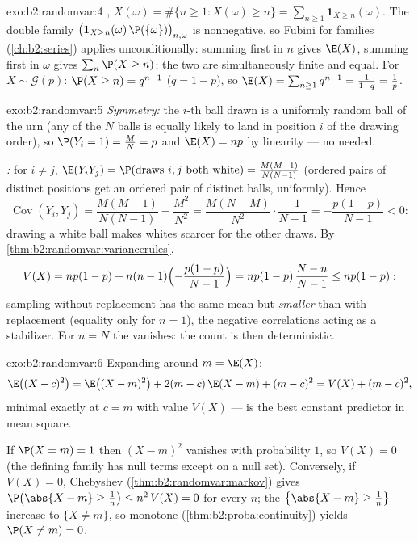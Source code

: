 \begin{solution}{exo:b2:randomvar:4}
, $X(\omega) = \#\{n \geq 1 : X(\omega) \geq n\} =
\sum_{n\geq1}\mathbf{1}_{X \geq n}(\omega)$. The double family
$\bigl(\mathbf{1}_{X \geq n}(\omega)\,\P(\{\omega\})\bigr)_{n,
\omega}$ is nonnegative, so Fubini for families
(\cref{ch:b2:series}) applies unconditionally: summing first in
$n$ gives $\E(X)$, summing first in $\omega$ gives $\sum_n \P(X
\geq n)$; the two are simultaneously finite and equal. For $X \sim
\mathcal{G}(p)$: $\P(X \geq n) = q^{n-1}$ ($q = 1-p$), so $\E(X) =
\sum_{n\geq1}q^{n-1} = \frac{1}{1 - q} = \frac1p$.
\end{solution}

\begin{solution}{exo:b2:randomvar:5}
\emph{Symmetry:} the $i$-th ball drawn is a uniformly random ball
of the urn (any of the $N$ balls is equally likely to land in
position $i$ of the drawing order), so $\P(Y_i = 1) = \frac MN =
p$ and $\E(X) = np$ by linearity --- no  needed.

\emph{:} for $i \neq j$, $\E(Y_iY_j) = \P(\text{draws }
i, j \text{ both white}) = \frac{M(M-1)}{N(N-1)}$ (ordered pairs
of distinct positions get an ordered pair of distinct balls,
uniformly). Hence
\[
\operatorname{Cov}(Y_i, Y_j)
= \frac{M(M-1)}{N(N-1)} - \frac{M^2}{N^2}
= \frac{M(N - M)}{N^2}\cdot\frac{-1}{N-1}
= -\frac{p(1-p)}{N-1} < 0 :
\]
drawing a white ball makes whites scarcer for the other draws.
By \cref{thm:b2:randomvar:variancerules},
\[
V(X) = np(1-p) + n(n-1)\Bigl(-\frac{p(1-p)}{N-1}\Bigr)
= np(1-p)\,\frac{N - n}{N - 1} \leq np(1-p) :
\]
sampling without replacement has the same mean but \emph{smaller}
 than with replacement (equality only for $n = 1$), the
negative correlations acting as a stabilizer. For $n = N$ the
 vanishes: the count is then deterministic.
\end{solution}

\begin{solution}{exo:b2:randomvar:6}
Expanding around $m = \E(X)$:
\[
\E\bigl((X - c)^2\bigr)
= \E\bigl((X - m)^2\bigr) + 2(m - c)\,\E(X - m) + (m - c)^2
= V(X) + (m - c)^2 ,
\]
minimal exactly at $c = m$ with value $V(X)$ ---  is
the best constant predictor in mean square.

If $\P(X = m) = 1$ then $(X - m)^2$ vanishes with probability
$1$, so $V(X) = 0$ (the defining family has null terms except on a
null set). Conversely, if $V(X) = 0$, Chebyshev
(\cref{thm:b2:randomvar:markov}) gives $\P\bigl(\abs{X - m} \geq
\frac1n\bigr) \leq n^2\,V(X) = 0$ for every $n$; the 
$\bigl\{\abs{X - m} \geq \frac1n\bigr\}$ increase to $\{X \neq
m\}$, so monotone  (\cref{thm:b2:proba:continuity})
yields $\P(X \neq m) = 0$.
\end{solution}


